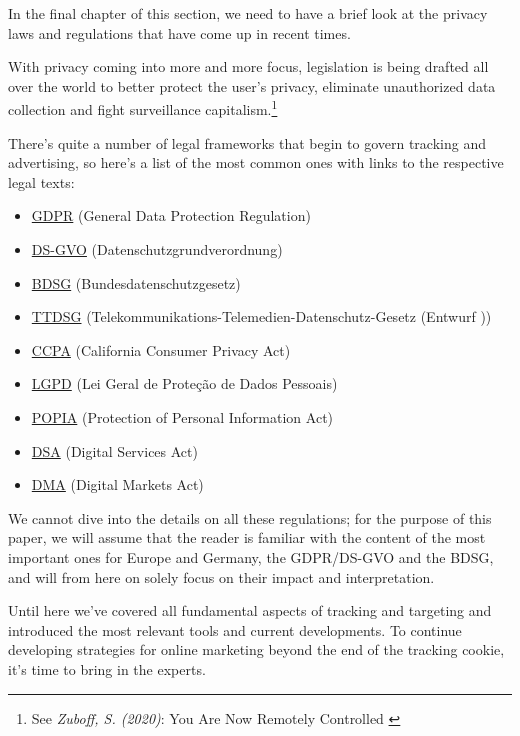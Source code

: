 In the final chapter of this section, we need to have a brief look at the privacy laws and regulations that have come up in recent times. 

With privacy coming into more and more focus, legislation is being drafted all over the world to better protect the user's privacy, eliminate unauthorized data collection and fight surveillance capitalism.\footnote{See \textit{Zuboff, S. (2020)}: You Are Now Remotely Controlled \cite{surveillance}} 

There's quite a number of legal frameworks that begin to govern tracking and advertising, so here's a list of the most common ones with links to the respective legal texts:

\begin{itemize}
 \item \href{https://gdpr-info.eu/}{GDPR} (General Data Protection Regulation)
 \item \href{https://www.datenschutz-grundverordnung.eu/}{DS-GVO} (Datenschutzgrundverordnung)
 \item \href{https://dsgvo-gesetz.de/bdsg/}{BDSG} (Bundesdatenschutzgesetz)
 \item \href{https://dsgvo-gesetz.de/ttdsg/}{TTDSG} (Telekommunikations-Telemedien-Datenschutz-Gesetz (Entwurf ))
 \item \href{https://oag.ca.gov/privacy/ccpa}{CCPA} (California Consumer Privacy Act)
 \item \href{https://www.lgpdbrasil.com.br/}{LGPD} (Lei Geral de Proteção de Dados Pessoais)
 \item \href{https://popia.co.za/}{POPIA} (Protection of Personal Information Act)
 \item \href{https://ec.europa.eu/info/strategy/priorities-2019-2024/europe-fit-digital-age/digital-services-act-ensuring-safe-and-accountable-online-environment_en}{DSA} (Digital Services Act)
 \item \href{https://ec.europa.eu/info/strategy/priorities-2019-2024/europe-fit-digital-age/digital-markets-act-ensuring-fair-and-open-digital-markets_en}{DMA} (Digital Markets Act)
\end{itemize}

We cannot dive into the details on all these regulations; for the purpose of this paper, we will assume that the reader is familiar with the content of the most important ones for Europe and Germany, the GDPR/DS-GVO and the BDSG, and will from here on solely focus on their impact and interpretation.

Until here we've covered all fundamental aspects of tracking and targeting and introduced the most relevant tools and current developments. To continue developing strategies for online marketing beyond the end of the tracking cookie, it's time to bring in the experts.
